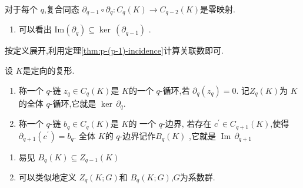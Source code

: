 \documentclass[../../几何与拓扑.tex]{subfiles}
\begin{document}
\begin{lemma}
    对于每个 \(  q  \),复合同态 \(  \partial _{q-1}  \circ \partial _{q}: C_{q}\left( K \right)\to C_{q-2}\left( K \right)  \)是零映射.  
\end{lemma}

\begin{remark}
    \begin{enumerate}
        \item 可以看出 \(  \mathrm{Im}\left( \partial _{q} \right) \subseteq  \operatorname{ker}\,\left( \partial _{q-1} \right)    \) .
    \end{enumerate}
    
\end{remark}

\begin{note}

    按定义展开,利用定理\ref{thm:p-(p-1)-incidence}计算关联数即可.

\end{note}


\begin{definition}
    设 \(  K  \)是定向的复形.
    \begin{enumerate}
        \item 称一个 \(  q  \)-链 \(  z_{q} \in C_{q}\left( K \right)   \)是 \(  K  \)的一个 \(  q  \)-循环,若 \(  \partial _{q}\left( z_{q} \right)= 0   \).      
        记\(  Z_{q}\left( K \right)   \)为 \(  K  \)的全体 \(  q  \)-循环,它就是 \(  \operatorname{ker}\,\partial _{q}  \).  
        \item 称一个 \(  q  \)-链 \(  b_{q} \in C_{q}\left( K \right)   \)是 \(  K  \)的 一个 \(  q  \)-边界,   若存在 \(  c^{\prime} \in C_{q+ 1}\left( K \right)   \),使得 \(  \partial _{q+ 1}\left( c^{\prime}  \right)  =  b_{q} \).
        全体  \(  K  \)的 \(  q  \)-边界记作\(  B_{q}\left( K \right)   \)  ,它就是 \(  \operatorname{Im}\,\partial _{q+ 1}  \)   
    \end{enumerate}
      
\end{definition}
\begin{remark}
    \begin{enumerate}
        \item 易见 \(  B_{q}\left( K \right)\subseteq  Z_{q-1}\left( K \right)    \) 
        \item 可以类似地定义 \(  Z_{q}\left( K;G \right)   \)和 \(  B_{q}\left( K;G \right)   \),\(  G  \)为系数群.   
    \end{enumerate}
    
\end{remark}
\end{document}
